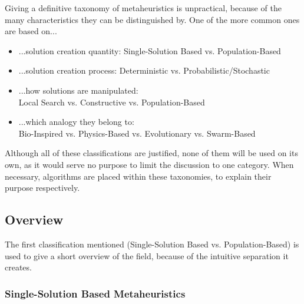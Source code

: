 Giving a definitive taxonomy of metaheuristics is unpractical, because of the many characteristics they can be distinguished by. 
One of the more common ones are based on...
\begin{itemize}
	\item ...solution creation quantity: Single-Solution Based vs. Population-Based
	\item ...solution creation process: Deterministic vs. Probabilistic/Stochastic
	\item ...how solutions are manipulated:\\ Local Search vs. Constructive vs. Population-Based \cite{sorensen2013metaheuristics}
	\item ...which analogy they belong to:\\ Bio-Inspired vs. Physics-Based vs. Evolutionary  vs. Swarm-Based
\end{itemize}

Although all of these classifications are justified, none of them will be used on its own, as it would serve no purpose to limit the discussion to one category. When necessary, algorithms are placed within these taxonomies, to explain their purpose respectively.

\subsection{Overview}

The first classification mentioned (Single-Solution Based vs. Population-Based) is used to give a short overview of the field, because of the intuitive separation it creates. 

\subsubsection{Single-Solution Based Metaheuristics}

